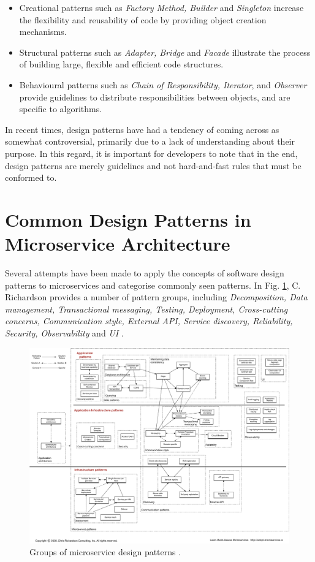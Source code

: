 \begin{itemize}
  \item Creational patterns such as \textit{Factory Method, Builder} and \textit{Singleton} increase the flexibility and reusability of code by providing object creation mechanisms.
  \item Structural patterns such as \textit{Adapter, Bridge} and \textit{Facade} illustrate the process of building large, flexible and efficient code structures.
  \item Behavioural patterns such as \textit{Chain of Responsibility, Iterator}, and \textit{Observer} provide guidelines to distribute responsibilities between objects, and are specific to algorithms.
\end{itemize}

In recent times, design patterns have had a tendency of coming across as somewhat controversial, primarily due to a lack of understanding about their purpose. In this regard, it is important for developers to note that in the end, design patterns are merely guidelines and not hard-and-fast rules that must be conformed to.

\section{Common Design Patterns in Microservice Architecture}

Several attempts have been made to  apply the concepts of software design patterns to microservices and categorise commonly seen patterns. In Fig. \ref{fig:richardson-patterns}, C. Richardson provides a number of pattern groups, including \textit{Decomposition, Data management, Transactional messaging, Testing, Deployment, Cross-cutting concerns, Communication style, External API, Service discovery, Reliability, Security, Observability} and \textit{UI} \cite{richardson-patterns}.

\begin{figure}[h]
  \centering
  \includegraphics[width=1.0\linewidth]{./assets/images/related-work/richardson-patterns.pdf}
  \caption{Groups of microservice design patterns \cite{richardson-patterns}.}
  \label{fig:richardson-patterns}
\end{figure}

